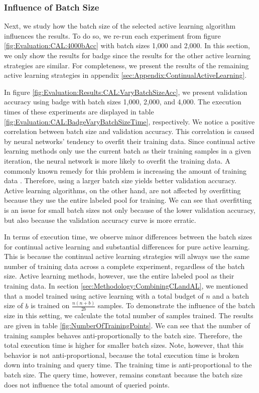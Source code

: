 \subsubsection{Influence of Batch Size}
\label{sec:Evaluation::CAL:ALRegCL:BatchSize}
Next, we study how the batch size of the selected active learning algorithm influences the results. To do so, we re-run each experiment from figure \ref{fig:Evaluation:CAL:4000bAcc}
with batch sizes 1,000 and 2,000. In this section, we only show the results for \gls{badge} since the results for the other active learning strategies are similar. For completeness, we
present the results of the remaining active learning strategies in appendix \ref{sec:Appendix:ContinualActiveLearning}. \par
In figure \ref{fig:Evaluation:Results:CAL:VaryBatchSizeAcc}, we present validation accuracy using \gls{badge} with batch sizes 1,000, 2,000, and 4,000. The execution times of these experiments
are displayed in table \ref{fig:Evaluation:CAL:BadgeVaryBatchSizeTime}, respectively. We notice a positive correlation between batch size and
validation accuracy. This correlation is caused by neural networks' tendency to overfit their training data. Since continual active learning methods only use the current batch as their training
samples in a given iteration, the neural network is more likely to overfit the training data. A commonly known remedy for this problem is increasing the amount of training data
\cite{ying2019overview}. Therefore, using a larger batch size yields better validation accuracy. Active learning algorithms, on the other hand, are not affected by overfitting because
they use the entire labeled pool for training. We can see that overfitting is an issue for small batch sizes not only because of the lower validation accuracy, but also because the validation
accuracy curve is more erratic. \par
In terms of execution time, we observe minor differences between the batch sizes for continual active learning and substantial differences for pure active learning. This is because the continual
active learning strategies will always use the same number of training data across a complete experiment, regardless of the batch size. Active learning methods, however, use the entire labeled pool
as their training data. In section \ref{sec:Methodology:CombiningCLandAL}, we mentioned that a model trained using active learning with a total budget of $n$ and a batch size of $b$ is trained
on $\frac{n(n+b)}{2b}$ samples. To demonstrate the influence of the batch size in this setting, we calculate the total number of samples trained. The results are given in table 
\ref{fig:NumberOfTrainingPoints}. We can see that the number of training samples behaves anti-proportionally to the batch size. Therefore, the total execution time is higher for smaller batch sizes.
Note, however, that this behavior is not anti-proportional, because the total execution time is broken down into training and query time. The training time is anti-proportional
to the batch size. The query time, however, remains constant because the batch size does not influence the total amount of queried points. \par

